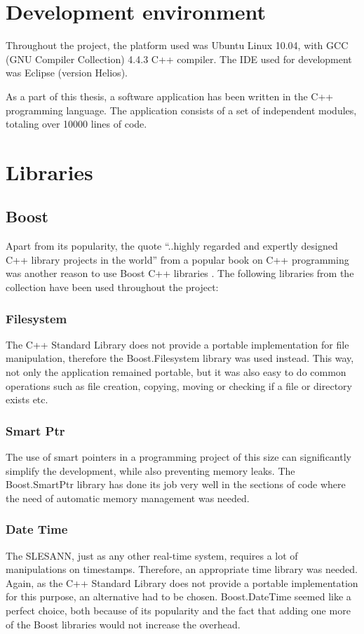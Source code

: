 \documentclass[times, utf8, zavrsni]{fer}
\begin{document}
\section{Development environment}
Throughout the project, the platform used was Ubuntu Linux 10.04, with GCC (GNU
Compiler Collection) 4.4.3 C++ compiler. The IDE used for development was
Eclipse (version Helios).

As a part of this thesis, a software application has been written in the C++
programming language. The application consists of a set of independent modules,
totaling over 10000 lines of code.

\section{Libraries}
\subsection{Boost}
Apart from its popularity, the quote ``..highly regarded and expertly designed
C++ library projects in the world'' from a popular book on C++ programming was
another reason to use Boost C++ libraries
\citep{boost:quote-c++-coding-standards}. The following libraries from the
collection have been used throughout the project:

\subsubsection{Filesystem}
The C++ Standard Library does not provide a portable implementation for file
manipulation, therefore the Boost.Filesystem library was used instead. This way,
not only the application remained portable, but it was also easy to do common
operations such as file creation, copying, moving or checking if a file or
directory exists etc.

\subsubsection{Smart Ptr}
The use of smart pointers in a programming project of this size can
significantly simplify the development, while also preventing memory leaks. The
Boost.SmartPtr library has done its job very well in the sections of code where
the need of automatic memory management was needed.

\subsubsection{Date Time}
The SLESANN, just as any other real-time system, requires a lot of manipulations
on timestamps. Therefore, an appropriate time library was needed. Again, as the
C++ Standard Library does not provide a portable implementation for this
purpose, an alternative had to be chosen. Boost.DateTime seemed like a perfect
choice, both because of its popularity and the fact that adding one more of the
Boost libraries would not increase the overhead.
\end{document}
